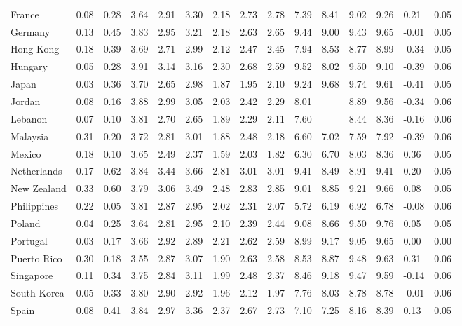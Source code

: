 \documentclass[
  man,floatsintext]{apa6}
\newenvironment{lltable}{\begin{landscape}\centering\begin{ThreePartTable}}{\end{ThreePartTable}\end{landscape}}
\begin{document}
\begin{lltable}
{\begin{longtable}{lllllllllllllll}
France & 0.08 & 0.28 & 3.64 & 2.91 & 3.30 & 2.18 & 2.73 & 2.78 & 7.39 & 8.41 & 9.02 & 9.26 & 0.21 & 0.05\\
Germany & 0.13 & 0.45 & 3.83 & 2.95 & 3.21 & 2.18 & 2.63 & 2.65 & 9.44 & 9.00 & 9.43 & 9.65 & -0.01 & 0.05\\
Hong Kong & 0.18 & 0.39 & 3.69 & 2.71 & 2.99 & 2.12 & 2.47 & 2.45 & 7.94 & 8.53 & 8.77 & 8.99 & -0.34 & 0.05\\
Hungary & 0.05 & 0.28 & 3.91 & 3.14 & 3.16 & 2.30 & 2.68 & 2.59 & 9.52 & 8.02 & 9.50 & 9.10 & -0.39 & 0.06\\
Japan & 0.03 & 0.36 & 3.70 & 2.65 & 2.98 & 1.87 & 1.95 & 2.10 & 9.24 & 9.68 & 9.74 & 9.61 & -0.41 & 0.05\\
Jordan & 0.08 & 0.16 & 3.88 & 2.99 & 3.05 & 2.03 & 2.42 & 2.29 & 8.01 &  & 8.89 & 9.56 & -0.34 & 0.06\\
Lebanon & 0.07 & 0.10 & 3.81 & 2.70 & 2.65 & 1.89 & 2.29 & 2.11 & 7.60 &  & 8.44 & 8.36 & -0.16 & 0.06\\
Malaysia & 0.31 & 0.20 & 3.72 & 2.81 & 3.01 & 1.88 & 2.48 & 2.18 & 6.60 & 7.02 & 7.59 & 7.92 & -0.39 & 0.06\\
Mexico & 0.18 & 0.10 & 3.65 & 2.49 & 2.37 & 1.59 & 2.03 & 1.82 & 6.30 & 6.70 & 8.03 & 8.36 & 0.36 & 0.05\\
Netherlands & 0.17 & 0.62 & 3.84 & 3.44 & 3.66 & 2.81 & 3.01 & 3.01 & 9.41 & 8.49 & 8.91 & 9.41 & 0.20 & 0.05\\
New Zealand & 0.33 & 0.60 & 3.79 & 3.06 & 3.49 & 2.48 & 2.83 & 2.85 & 9.01 & 8.85 & 9.21 & 9.66 & 0.08 & 0.05\\
Philippines & 0.22 & 0.05 & 3.81 & 2.87 & 2.95 & 2.02 & 2.31 & 2.07 & 5.72 & 6.19 & 6.92 & 6.78 & -0.08 & 0.06\\
Poland & 0.04 & 0.25 & 3.64 & 2.81 & 2.95 & 2.10 & 2.39 & 2.44 & 9.08 & 8.66 & 9.50 & 9.76 & 0.05 & 0.05\\
Portugal & 0.03 & 0.17 & 3.66 & 2.92 & 2.89 & 2.21 & 2.62 & 2.59 & 8.99 & 9.17 & 9.05 & 9.65 & 0.00 & 0.00\\
Puerto Rico & 0.30 & 0.18 & 3.55 & 2.87 & 3.07 & 1.90 & 2.63 & 2.58 & 8.53 & 8.87 & 9.48 & 9.63 & 0.31 & 0.06\\
Singapore & 0.11 & 0.34 & 3.75 & 2.84 & 3.11 & 1.99 & 2.48 & 2.37 & 8.46 & 9.18 & 9.47 & 9.59 & -0.14 & 0.06\\
South Korea & 0.05 & 0.33 & 3.80 & 2.90 & 2.92 & 1.96 & 2.12 & 1.97 & 7.76 & 8.03 & 8.78 & 8.78 & -0.01 & 0.06\\
Spain & 0.08 & 0.41 & 3.84 & 2.97 & 3.36 & 2.37 & 2.67 & 2.73 & 7.10 & 7.25 & 8.16 & 8.39 & 0.13 & 0.05\\

\end{longtable}}
\end{lltable}
\end{document}
